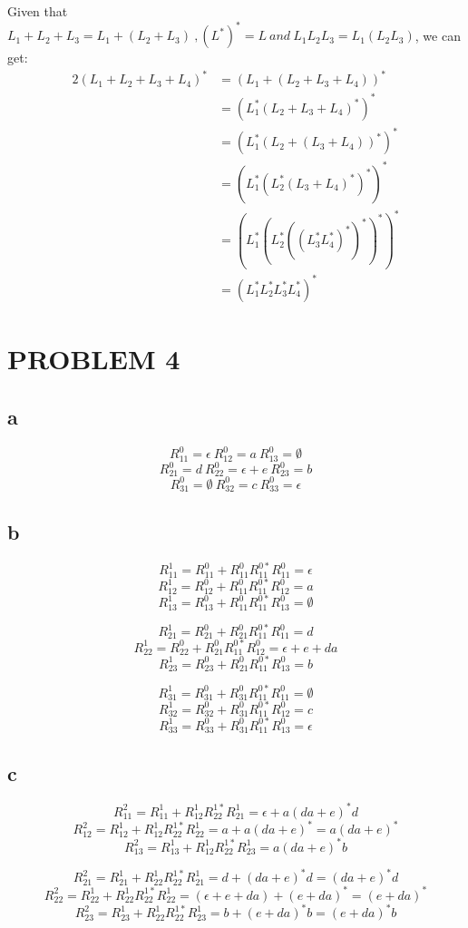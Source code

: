 \documentclass{ctexart}
\begin{document}
Given that $L_1+L_2+L_3=L_1+(L_2+L_3)\ ,(L^*)^*=L\ and\ L_1L_2L_3=L_1(L_2L_3) $, we can get:\\
\begin{alignat*}{2}
	(L_1+L_2+L_3+L_4)^*&=(L_1+(L_2+L_3+L_4))^*\\
	&=(L_1^*(L_2+L_3+L_4)^*)^*\\
	&=(L_1^*(L_2+(L_3+L_4))^*)^*\\
	&=(L_1^*(L_2^*(L_3+L_4)^*)^*)^*\\
	&=(L_1^*(L_2^*((L_3^*L_4^*)^*)^*)^*)^*\\
	&=(L_1^*L_2^*L_3^*L_4^*)^*
\end{alignat*}

\section{PROBLEM 4}
\subsection{a}
\[R_{11}^0 = \epsilon\ R_{12}^0=a\ R_{13}^0=\emptyset\]
\[R_{21}^0 = d\ R_{22}^0=\epsilon+e\ R_{23}^0=b\]
\[R_{31}^0 = \emptyset\ R_{32}^0=c\ R_{33}^0=\epsilon\]
\subsection{b}
\[R_{11}^1 = R_{11}^0 +R_{11}^0R_{11}^{0*}R_{11}^0 = \epsilon  \]
\[R_{12}^1 = R_{12}^0 +R_{11}^0R_{11}^{0*}R_{12}^0 = a  \]
\[R_{13}^1 = R_{13}^0 +R_{11}^0R_{11}^{0*}R_{13}^0 = \emptyset  \]

\[R_{21}^1 = R_{21}^0 +R_{21}^0R_{11}^{0*}R_{11}^0 = d  \]
\[R_{22}^1 = R_{22}^0 +R_{21}^0R_{11}^{0*}R_{12}^0 = \epsilon+e+da  \]
\[R_{23}^1 = R_{23}^0 +R_{21}^0R_{11}^{0*}R_{13}^0 = b  \]

\[R_{31}^1 = R_{31}^0 +R_{31}^0R_{11}^{0*}R_{11}^0 = \emptyset  \]
\[R_{32}^1 = R_{32}^0 +R_{31}^0R_{11}^{0*}R_{12}^0 = c  \]
\[R_{33}^1 = R_{33}^0 +R_{31}^0R_{11}^{0*}R_{13}^0 = \epsilon  \]

\subsection{c}
\[R_{11}^2 = R_{11}^1 +R_{12}^1R_{22}^{1*}R_{21}^1 = \epsilon+a(da+e)^*d  \]
\[R_{12}^2 = R_{12}^1 +R_{12}^1R_{22}^{1*}R_{22}^1 = a+a(da+e)^*=a(da+e)^*  \]
\[R_{13}^2 = R_{13}^1 +R_{12}^1R_{22}^{1*}R_{23}^1 = a(da+e)^*b  \]

\[R_{21}^2 = R_{21}^1 +R_{22}^1R_{22}^{1*}R_{21}^1 = d+(da+e)^*d=(da+e)^*d  \]
\[R_{22}^2 = R_{22}^1 +R_{22}^1R_{22}^{1*}R_{22}^1 = (\epsilon+e+da)+(e+da)^*=(e+da)^*  \]
\[R_{23}^2 = R_{23}^1 +R_{22}^1R_{22}^{1*}R_{23}^1 = b+(e+da)^*b=(e+da)^*b  \]
\end{document}
